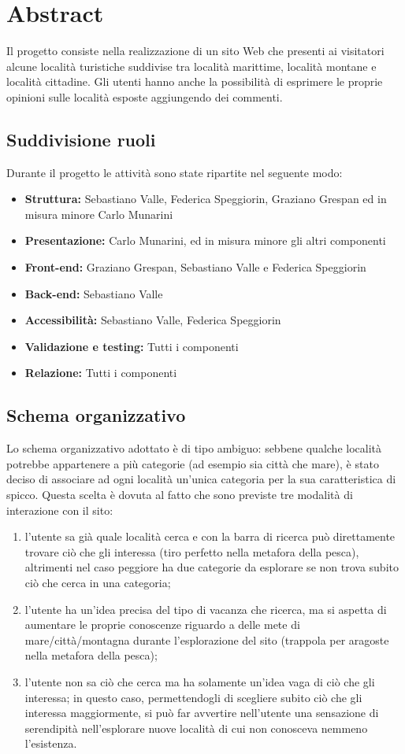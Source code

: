 \section{Abstract}
Il progetto consiste nella realizzazione di un sito Web che presenti ai
visitatori alcune località turistiche suddivise tra località marittime,
località montane e località cittadine.
Gli utenti hanno anche la possibilità di esprimere le proprie opinioni sulle
località esposte aggiungendo dei commenti.

\subsection{Suddivisione ruoli}
Durante il progetto le attività sono state ripartite nel seguente modo:
\begin{itemize}
\item \textbf{Struttura:} Sebastiano Valle, Federica Speggiorin, Graziano Grespan ed in misura minore Carlo Munarini
\item \textbf{Presentazione:} Carlo Munarini, ed in misura minore gli altri componenti
\item \textbf{Front-end:} Graziano Grespan, Sebastiano Valle e Federica Speggiorin
\item \textbf{Back-end:} Sebastiano Valle
\item \textbf{Accessibilità:} Sebastiano Valle, Federica Speggiorin
\item \textbf{Validazione e testing:} Tutti i componenti
\item \textbf{Relazione:} Tutti i componenti
\end{itemize}

\subsection{Schema organizzativo}
Lo schema organizzativo adottato è di tipo ambiguo: sebbene qualche località potrebbe appartenere a più categorie (ad esempio sia città che mare), è stato deciso di associare ad ogni località un'unica categoria per la sua caratteristica di spicco.
Questa scelta è dovuta al fatto che sono previste tre modalità di interazione con il sito:
\begin{enumerate}
\item  l'utente sa già quale località cerca e con la barra di ricerca può direttamente trovare ciò che gli interessa (tiro perfetto nella metafora della pesca), altrimenti nel caso peggiore ha due categorie da esplorare se non trova subito ciò che cerca in una categoria;
\item l'utente ha un'idea precisa del tipo di vacanza che ricerca, ma si aspetta di aumentare le proprie conoscenze riguardo a delle mete di mare/città/montagna durante l'esplorazione del sito (trappola per aragoste nella metafora della pesca);
\item l'utente non sa ciò che cerca ma ha solamente un'idea vaga di ciò che gli interessa; in questo caso, permettendogli di scegliere subito ciò che gli interessa maggiormente, si può far avvertire nell'utente una sensazione di serendipità nell'esplorare nuove località di cui non conosceva nemmeno l'esistenza.
\end{enumerate}
